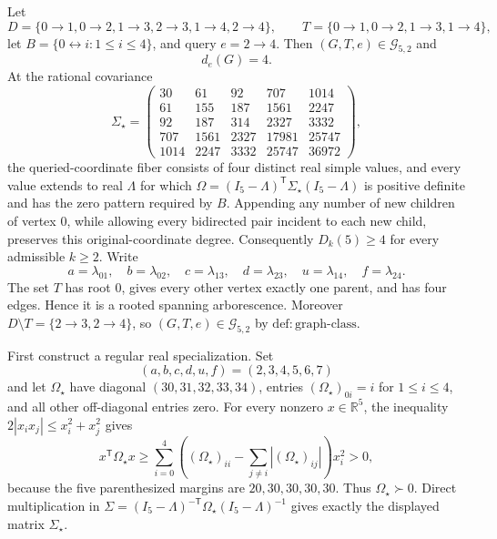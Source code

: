 Let
\[
D=\{0\to1,0\to2,1\to3,2\to3,1\to4,2\to4\},\qquad
T=\{0\to1,0\to2,1\to3,1\to4\},
\]
let \(B=\{0\leftrightarrow i:1\le i\le4\}\), and query \(e=2\to4\). Then \((G,T,e)\in\mathcal G_{5,2}\) and
\[
d_e(G)=4.
\]
At the rational covariance
\[
\Sigma_\star=
\begin{pmatrix}
30&61&92&707&1014\\
61&155&187&1561&2247\\
92&187&314&2327&3332\\
707&1561&2327&17981&25747\\
1014&2247&3332&25747&36972
\end{pmatrix},
\]
the queried-coordinate fiber consists of four distinct real simple values, and every value extends to real \(\Lambda\) for which \(\Omega=(I_5-\Lambda)^{\mathsf T}\Sigma_\star(I_5-\Lambda)\) is positive definite and has the zero pattern required by \(B\). Appending any number of new children of vertex \(0\), while allowing every bidirected pair incident to each new child, preserves this original-coordinate degree. Consequently \(D_k(5)\ge4\) for every admissible \(k\ge2\).
Write
\[
a=\lambda_{01},\quad b=\lambda_{02},\quad c=\lambda_{13},\quad
d=\lambda_{23},\quad u=\lambda_{14},\quad f=\lambda_{24}.
\]
The set \(T\) has root \(0\), gives every other vertex exactly one parent, and has four edges. Hence it is a rooted spanning arborescence. Moreover \(D\setminus T=\{2\to3,2\to4\}\), so \((G,T,e)\in\mathcal G_{5,2}\) by \(\mathrm{def:graph\mbox{-}class}\).

First construct a regular real specialization. Set
\[
(a,b,c,d,u,f)=(2,3,4,5,6,7)
\]
and let \(\Omega_\star\) have diagonal \((30,31,32,33,34)\), entries \((\Omega_\star)_{0i}=i\) for \(1\le i\le4\), and all other off-diagonal entries zero. For every nonzero \(x\in\mathbb R^5\), the inequality \(2|x_ix_j|\le x_i^2+x_j^2\) gives
\[
x^{\mathsf T}\Omega_\star x
\ge \sum_{i=0}^4\left((\Omega_\star)_{ii}
-\sum_{j\ne i}|(\Omega_\star)_{ij}|\right)x_i^2>0,
\]
because the five parenthesized margins are \(20,30,30,30,30\). Thus \(\Omega_\star\succ0\). Direct multiplication in
\(\Sigma=(I_5-\Lambda)^{-\mathsf T}\Omega_\star(I_5-\Lambda)^{-1}\) gives exactly the displayed matrix \(\Sigma_\star\).


